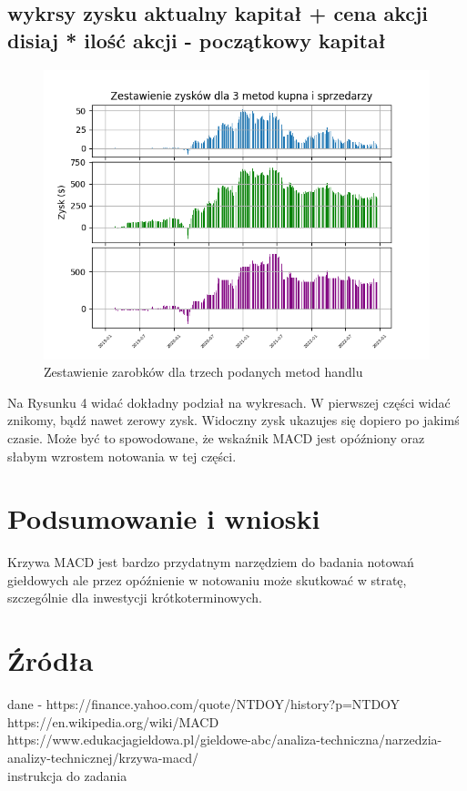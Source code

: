 \documentclass{article}
\begin{document}
    \subsection{wykrsy zysku aktualny kapitał + cena akcji disiaj * ilość akcji - początkowy kapitał}
    \begin{figure}[ht]
        \centering
        \includegraphics[scale=0.6]{MethodComparision}
        \caption{Zestawienie zarobków dla trzech podanych metod handlu}
    \end{figure}    

    Na Rysunku 4 widać dokładny podział na wykresach. W pierwszej części widać znikomy, bądź nawet zerowy zysk. Widoczny zysk ukazujes się dopiero po jakimś czasie. 
    Może być to spowodowane, że wskaźnik MACD jest opóźniony oraz słabym wzrostem notowania w tej części.
    
    \section{Podsumowanie i wnioski}
    Krzywa MACD jest bardzo przydatnym narzędziem do badania notowań giełdowych ale przez opóźnienie w notowaniu może skutkować w stratę, szczególnie dla inwestycji krótkoterminowych. 

    \section{Źródła}
    dane - https://finance.yahoo.com/quote/NTDOY/history?p=NTDOY\\
    https://en.wikipedia.org/wiki/MACD\\
    https://www.edukacjagieldowa.pl/gieldowe-abc/analiza-techniczna/narzedzia-analizy-technicznej/krzywa-macd/\\
    instrukcja do zadania\\
\end{document}
